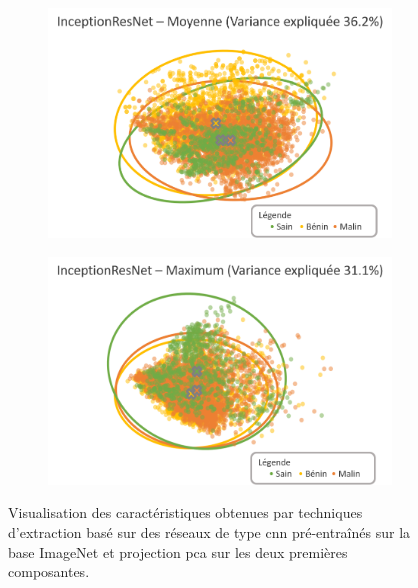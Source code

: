 \begin{figure}[H]
    \begin{subfigure}{.45\textwidth}
      \includegraphics[width=\textwidth]{contents/chapter_4/resources/visualisation_transfer_InceptionResNetAvg.png}
    \end{subfigure}
    \begin{subfigure}{.45\textwidth}
      \includegraphics[width=\textwidth]{contents/chapter_4/resources/visualisation_transfer_InceptionResNetMax.png}
    \end{subfigure}
    
    \caption{Visualisation des caractéristiques obtenues par techniques d'extraction basé sur des réseaux de type \gls{cnn} pré-entraînés sur la base ImageNet et projection \gls{pca} sur les deux premières composantes.}
    \label{fig:visualisation_transfer}
\end{figure}\par

